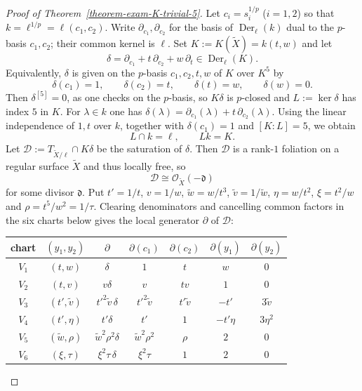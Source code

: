 \documentclass[reqno,oneside]{amsart}
\theoremstyle{definition}
\theoremstyle{plain}
\numberwithin{equation}{section}
\begin{document}
\begin{proof}[Proof of Theorem~\ref{theorem-exam-K-trivial-5}]
    \medskip
  Let $c_i = s_i^{1/p}$ ($i=1,2$) so that $k = \ell^{1/p} = \ell(c_1,c_2)$.
  Write $\partial_{c_1},\partial_{c_2}$ for the basis of
  $\operatorname{Der}_\ell(k)$ dual to the $p$-basis $c_1,c_2$; their common
  kernel is $\ell$.
  Set $K:=K(\widetilde X) = k(t,w)$ and let \[
    \delta=\partial_{c_1}+t\,\partial_{c_2}+w\,\partial_t \in \operatorname{Der}_\ell(K).
  \]
  Equivalently, $\delta$ is given on the $p$-basis $c_1,c_2,t,w$ of $K$ over $K^5$ by
  \[
    \delta(c_1)=1,\qquad \delta(c_2)=t,\qquad \delta(t)=w,\qquad \delta(w)=0.
  \]
  Then $\delta^{[5]}=0$, as one checks on the $p$-basis, so $K\delta$ is $p$-closed and $L:=\ker\delta$ has index $5$ in $K$.
  For $\lambda\in k$ one has
  $\delta(\lambda)=\partial_{c_1}(\lambda)+t\,\partial_{c_2}(\lambda)$.
  Using the linear independence of $1,t$ over $k$, together with
  $\delta(c_1)=1$ and $[K:L]=5$, we obtain
  \begin{equation}\label{equation-exam-5-Lk}
    L\cap k=\ell,\qquad Lk=K .
  \end{equation}
  Let $\mathcal D:=T_{\widetilde X/\ell}\cap K\delta$ be the saturation of $\delta$.
  Then $\mathcal D$ is a rank-$1$ foliation on a regular surface $\widetilde X$ and thus locally free, so
  \[
    \mathcal D \cong\mathcal O_{\widetilde X}(-\mathfrak d)
  \]
  for some divisor $\mathfrak d$.
  Put $t'=1/t$, $v=1/w$, $\tilde w=w/t^3$, $\tilde v=1/\tilde w$, $\eta=w/t^2$, $\xi=t^2/w$ and $\rho=t^5/w^2=1/\tau$.
  Clearing denominators and cancelling common factors in the six charts below gives the local generator $\partial$ of $\mathcal D$:
  \begin{center}
  \renewcommand{\arraystretch}{1.2}
  \begin{tabular}{c|c|c|cccc}
    chart & $(y_1,y_2)$ & $\partial$ & $\partial(c_1)$ & $\partial(c_2)$ & $\partial(y_1)$ & $\partial(y_2)$ \\ \hline
    $V_1$ & $(t,w)$ & $\delta$ & $1$ & $t$ & $w$ & $0$ \\
    $V_2$ & $(t,v)$ & $v\delta$ & $v$ & $tv$ & $1$ & $0$ \\
    $V_3$ & $(t',\tilde v)$ & $t'^2\tilde v\,\delta$ & $t'^2\tilde v$ & $t'\tilde v$ & $-t'$ & $3\tilde v$ \\
    $V_4$ & $(t',\eta)$ & $t'\delta$ & $t'$ & $1$ & $-t'\eta$ & $3\eta^2$ \\
    $V_5$ & $(\tilde w,\rho)$ & $\tilde w^2\rho^2\delta$ & $\tilde w^2\rho^2$ & $\rho$ & $2$ & $0$ \\
    $V_6$ & $(\xi,\tau)$ & $\xi^2\tau\,\delta$ & $\xi^2\tau$ & $1$ & $2$ & $0$

\end{tabular}
\end{center}
\end{proof}
\end{document}
